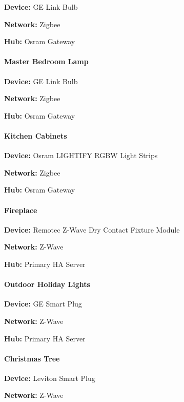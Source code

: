 \documentclass[]{article}
\let\oldparagraph\paragraph
\renewcommand{\paragraph}[1]{\oldparagraph{#1}\mbox{}}
\begin{document}
\textbf{Device: }
{GE Link Bulb}

\textbf{Network: }
{Zigbee}

\textbf{Hub: }
{Osram Gateway}

\paragraph{\texorpdfstring{{Master Bedroom Lamp}}{Master Bedroom Lamp}}

\textbf{Device: }
{GE Link Bulb}

\textbf{Network: }
{Zigbee}

\textbf{Hub: }
{Osram Gateway}

\paragraph{\texorpdfstring{{Kitchen Cabinets}}{Kitchen Cabinets}}

\textbf{Device: }
{Osram LIGHTIFY RGBW Light Strips}

\textbf{Network: }
{Zigbee}

\textbf{Hub: }
{Osram Gateway}

\paragraph{\texorpdfstring{{Fireplace}}{Fireplace}}

\textbf{Device: }
{Remotec Z-Wave Dry Contact Fixture Module}

\textbf{Network: }
{Z-Wave}

\textbf{Hub: }
{Primary HA Server}

\paragraph{\texorpdfstring{{Outdoor Holiday Lights}}{Outdoor Holiday Lights}}

\textbf{Device: }
{GE Smart Plug}

\textbf{Network: }
{Z-Wave}

\textbf{Hub: }
{Primary HA Server}

\paragraph{\texorpdfstring{{Christmas Tree}}{Christmas Tree}}

\textbf{Device: }
{Leviton Smart Plug}

\textbf{Network: }
{Z-Wave}
\end{document}
